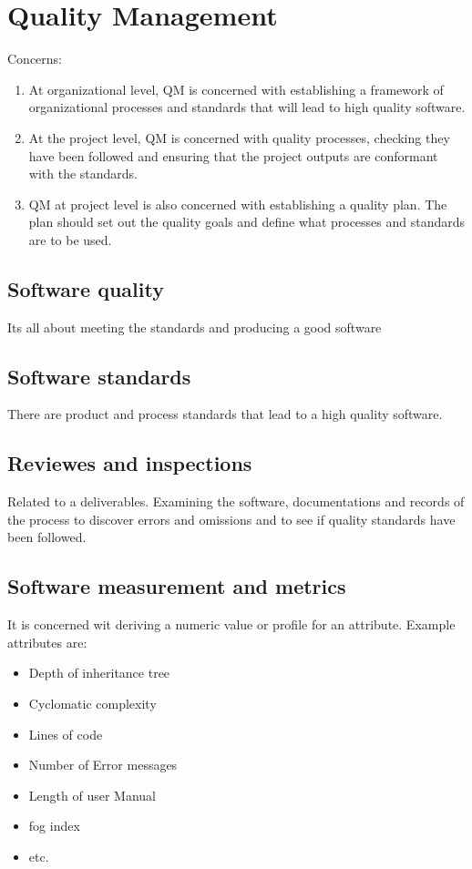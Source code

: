 \documentclass[a4paper,11pt,twocolumn]{report}
\begin{document}
    \chapter{Quality Management}
    Concerns:
    \begin{enumerate}
        \item At organizational level, QM is concerned with establishing a
            framework of organizational processes and standards that will lead
            to high quality software.
        \item At the project level, QM is concerned with quality processes,
            checking they have been followed and ensuring that the project
            outputs are conformant with the standards.
        \item QM at project level is also concerned with establishing a quality
            plan. The plan should set out the quality goals and define what
            processes and standards are to be used.
    \end{enumerate}
    \section{Software quality}
    Its all about meeting the standards and producing a good software
    \section{Software standards}
    There are product and process standards that lead to a high quality
    software.
    \section{Reviewes and inspections}
    Related to a deliverables. Examining the software, documentations and
    records of the process to discover errors and omissions and to see if
    quality standards have been followed.
    \section{Software measurement and metrics}
    It is concerned wit deriving a numeric value or profile for an attribute.
    Example attributes are:
    \begin{itemize}
        \item Depth of inheritance tree
        \item Cyclomatic complexity
        \item Lines of code
        \item Number of Error messages
        \item Length of user Manual
        \item fog index
        \item etc.
    \end{itemize}
    
\end{document}
